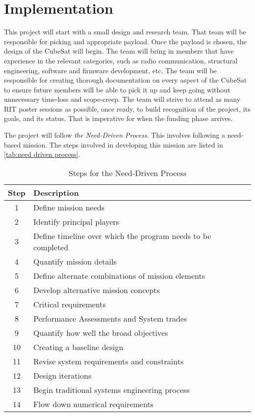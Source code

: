 \documentclass[conference]{IEEEtran} %
\begin{document}
\section{Implementation}
\label{sec:implementation}
This project will start with a small design and research team. That team will be responsible for picking and appropriate payload. Once the payload is chosen, the
design of the CubeSat will begin. The team will bring in members that have experience in the relevant categories, such as radio communication, structural engineering,
software and firmware development, etc. The team will be responsible for creating thorough documentation on every aspect of the CubeSat to ensure future members will be able to pick it up and
keep going without unnecessary time-loss and scope-creep. The team will strive to attend as many RIT poster sessions as possible, once ready, to
build recognition of the project, its goals, and its status. That is imperative for when the funding phase arrives.

The project will follow \textit{the Need-Driven Process}. This involves following a need-based mission. The steps involved in developing this mission are listed in \autoref{tab:need driven process}.

\begin{table}[h!]
    \caption{Steps for the Need-Driven Process}
    \centering
    \begin{tabular}{@{}cl@{}}
    \toprule
    Step & Description \\
    \midrule
    1 & Define mission needs \\
    2 & Identify principal players \\
    3 & Define timeline over which the program needs to be completed \\
    4 & Quantify mission details \\
    5 & Define alternate combinations of mission elements \\
    6 & Develop alternative mission concepts \\
    7 & Critical requirements \\
    8 & Performance Assessments and System trades \\
    9 & Quantify how well the broad objectives \\
    10 & Creating a baseline design \\
    11 & Revise system requirements and constraints \\
    12 & Design iterations \\
    13 & Begin traditional systems engineering process \\
    14 & Flow down numerical requirements \\
    \bottomrule
    \end{tabular}
\label{tab:need driven process}
\end{table}
\end{document}
